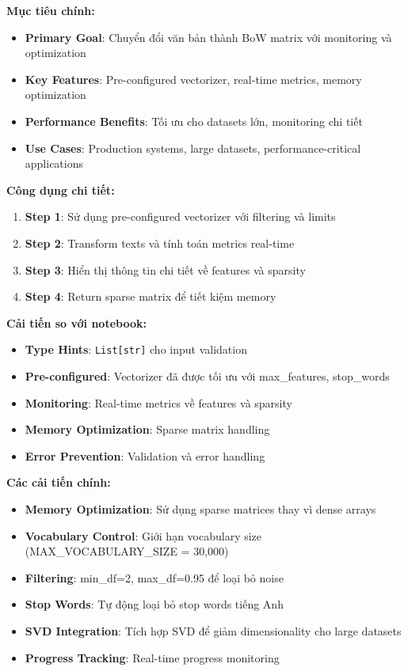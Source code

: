 \textbf{Mục tiêu chính:}
\begin{itemize}
    \item \textbf{Primary Goal}: Chuyển đổi văn bản thành BoW matrix với monitoring và optimization
    \item \textbf{Key Features}: Pre-configured vectorizer, real-time metrics, memory optimization
    \item \textbf{Performance Benefits}: Tối ưu cho datasets lớn, monitoring chi tiết
    \item \textbf{Use Cases}: Production systems, large datasets, performance-critical applications
\end{itemize}

\textbf{Công dụng chi tiết:}
\begin{enumerate}
    \item \textbf{Step 1}: Sử dụng pre-configured vectorizer với filtering và limits
    \item \textbf{Step 2}: Transform texts và tính toán metrics real-time
    \item \textbf{Step 3}: Hiển thị thông tin chi tiết về features và sparsity
    \item \textbf{Step 4}: Return sparse matrix để tiết kiệm memory
\end{enumerate}

\textbf{Cải tiến so với notebook:}
\begin{itemize}
    \item \textbf{Type Hints}: \texttt{List[str]} cho input validation
    \item \textbf{Pre-configured}: Vectorizer đã được tối ưu với max\_features, stop\_words
    \item \textbf{Monitoring}: Real-time metrics về features và sparsity
    \item \textbf{Memory Optimization}: Sparse matrix handling
    \item \textbf{Error Prevention}: Validation và error handling
\end{itemize}

\textbf{Các cải tiến chính:}
\begin{itemize}
    \item \textbf{Memory Optimization}: Sử dụng sparse matrices thay vì dense arrays
    \item \textbf{Vocabulary Control}: Giới hạn vocabulary size (MAX\_VOCABULARY\_SIZE = 30,000)
    \item \textbf{Filtering}: min\_df=2, max\_df=0.95 để loại bỏ noise
    \item \textbf{Stop Words}: Tự động loại bỏ stop words tiếng Anh
    \item \textbf{SVD Integration}: Tích hợp SVD để giảm dimensionality cho large datasets
    \item \textbf{Progress Tracking}: Real-time progress monitoring
\end{itemize}

